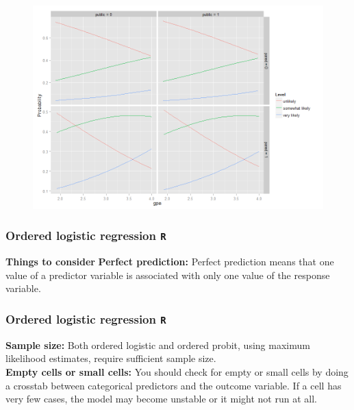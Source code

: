 \documentclass[00-GLMregslides.tex]{subfiles}
\begin{document}
\begin{frame}

\begin{figure}
\centering
\includegraphics[width=0.99\linewidth]{ologit3}
\end{figure}
	
\end{frame}
\begin{frame}[fragile]
\frametitle{Ordered logistic regression \texttt{R} }
\Large
\textbf{Things to consider
}
\textbf{Perfect prediction: }Perfect prediction means that one value of a predictor variable is associated with only one value of the response variable. 
\end{frame}
\begin{frame}[fragile]
	\frametitle{Ordered logistic regression \texttt{R} }
	\Large
\textbf{Sample size:} Both ordered logistic and ordered probit, using maximum likelihood estimates, require sufficient sample size.
\\
\textbf{Empty cells or small cells:} You should check for empty or small cells by doing a crosstab between categorical predictors and the outcome variable. If a cell has very few cases, the model may become unstable or it might not run at all.
\end{frame}
\end{document}

